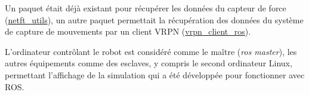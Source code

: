 \begin{appendices}
	Un paquet était déjà existant pour récupérer les données du capteur de force (\href{https://github.com/UTNuclearRoboticsPublic/netft_utils}{netft\_utils}), un autre paquet permettait la récupération des données du système de capture de mouvements par un client VRPN (\href{https://github.com/ros-drivers/vrpn_client_ros}{vrpn\_client\_ros}).
	
	L'ordinateur contrôlant le robot est considéré comme le maître (\textit{ros master}), les autres équipements comme des esclaves, y compris le second ordinateur Linux, permettant l'affichage de la simulation qui a été développée pour fonctionner avec ROS.
	
	

\end{appendices}
